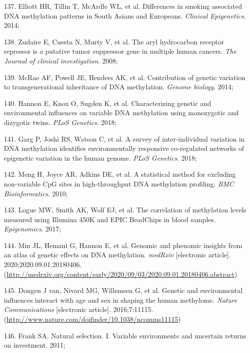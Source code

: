 \documentclass[11pt,oneside]{bristolthesis}
\newenvironment{cslreferences}%
  {}%
  {\par}
\begin{document}
\begin{cslreferences}
\leavevmode\hypertarget{ref-Elliott2014}{}%
137. Elliott HR, Tillin T, McArdle WL, et al. Differences in smoking associated DNA methylation patterns in South Asians and Europeans. \emph{Clinical Epigenetics}. 2014;

\leavevmode\hypertarget{ref-Zudaire2008}{}%
138. Zudaire E, Cuesta N, Murty V, et al. The aryl hydrocarbon receptor repressor is a putative tumor suppressor gene in multiple human cancers. \emph{The Journal of clinical investigation}. 2008;

\leavevmode\hypertarget{ref-McRae2014}{}%
139. McRae AF, Powell JE, Henders AK, et al. Contribution of genetic variation to transgenerational inheritance of DNA methylation. \emph{Genome biology}. 2014;

\leavevmode\hypertarget{ref-Hannon2018}{}%
140. Hannon E, Knox O, Sugden K, et al. Characterizing genetic and environmental influences on variable DNA methylation using monozygotic and dizygotic twins. \emph{PLoS Genetics}. 2018;

\leavevmode\hypertarget{ref-Garg2018}{}%
141. Garg P, Joshi RS, Watson C, et al. A survey of inter-individual variation in DNA methylation identifies environmentally responsive co-regulated networks of epigenetic variation in the human genome. \emph{PLoS Genetics}. 2018;

\leavevmode\hypertarget{ref-Meng2010}{}%
142. Meng H, Joyce AR, Adkins DE, et al. A statistical method for excluding non-variable CpG sites in high-throughput DNA methylation profiling. \emph{BMC Bioinformatics}. 2010;

\leavevmode\hypertarget{ref-Logue2017}{}%
143. Logue MW, Smith AK, Wolf EJ, et al. The correlation of methylation levels measured using Illumina 450K and EPIC BeadChips in blood samples. \emph{Epigenomics}. 2017;

\leavevmode\hypertarget{ref-Min2020}{}%
144. Min JL, Hemani G, Hannon E, et al. Genomic and phenomic insights from an atlas of genetic effects on DNA methylation. \emph{medRxiv} {[}electronic article{]}. 2020;2020.09.01.20180406. (\url{http://medrxiv.org/content/early/2020/09/03/2020.09.01.20180406.abstract})

\leavevmode\hypertarget{ref-VanDongen2016}{}%
145. Dongen J van, Nivard MG, Willemsen G, et al. Genetic and environmental influences interact with age and sex in shaping the human methylome. \emph{Nature Communications} {[}electronic article{]}. 2016;7:11115. (\url{http://www.nature.com/doifinder/10.1038/ncomms11115})

\leavevmode\hypertarget{ref-Frank2011}{}%
146. Frank SA. Natural selection. I. Variable environments and uncertain returns on investment. 2011;


\end{cslreferences}
\end{document}
